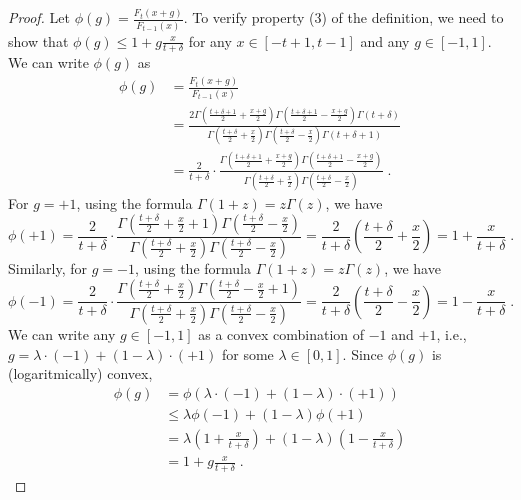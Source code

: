 \begin{proof}
Let $\phi(g) = \frac{F_t(x+g)}{F_{t-1}(x)}$. To verify property (3) of the definition,
we need to show that $\phi(g) \le 1 + g \frac{x}{t+\delta}$
for any $x \in [-t+1, t-1]$ and any $g \in [-1,1]$. We can write $\phi(g)$ as
\begin{align*}
\phi(g)
& = \frac{F_t(x+g)}{F_{t-1}(x)} \\
& = \frac{2 \Gamma(\frac{t+\delta+1}{2} + \frac{x+g}{2}) \Gamma(\frac{t+\delta+1}{2} - \frac{x+g}{2}) \Gamma(t + \delta)}{\Gamma(\frac{t+\delta}{2} + \frac{x}{2}) \Gamma(\frac{t+\delta}{2} - \frac{x}{2}) \Gamma(t+\delta+1)} \\
& = \frac{2}{t+\delta} \cdot \frac{\Gamma(\frac{t+\delta+1}{2} + \frac{x+g}{2}) \Gamma(\frac{t+\delta+1}{2} - \frac{x+g}{2})}{\Gamma(\frac{t+\delta}{2} + \frac{x}{2}) \Gamma(\frac{t+\delta}{2} - \frac{x}{2})} \; .
\end{align*}
For $g=+1$, using the formula $\Gamma(1+z) = z \Gamma(z)$, we have
$$
\phi(+1)
= \frac{2}{t+\delta} \cdot \frac{\Gamma(\frac{t+\delta}{2} + \frac{x}{2} + 1) \Gamma(\frac{t+\delta}{2} - \frac{x}{2})}{\Gamma(\frac{t+\delta}{2} + \frac{x}{2}) \Gamma(\frac{t+\delta}{2} - \frac{x}{2})}
= \frac{2}{t+\delta} \left(\frac{t+\delta}{2} + \frac{x}{2} \right)
= 1 + \frac{x}{t+\delta} \; .
$$
Similarly, for $g=-1$, using the formula $\Gamma(1+z) = z \Gamma(z)$, we have
$$
\phi(-1)
= \frac{2}{t+\delta} \cdot \frac{\Gamma(\frac{t+\delta}{2} + \frac{x}{2}) \Gamma(\frac{t+\delta}{2} - \frac{x}{2} + 1)}{\Gamma(\frac{t+\delta}{2} + \frac{x}{2}) \Gamma(\frac{t+\delta}{2} - \frac{x}{2})}
= \frac{2}{t+\delta} \left(\frac{t+\delta}{2} - \frac{x}{2} \right)
= 1 - \frac{x}{t+\delta} \; .
$$
We can write any $g \in [-1,1]$ as a convex combination of $-1$ and $+1$, i.e.,
$g = \lambda \cdot (-1) + (1-\lambda) \cdot (+1)$ for some $\lambda \in [0,1]$.
Since $\phi(g)$ is (logaritmically) convex,
\begin{align*}
\phi(g)
& = \phi(\lambda \cdot (-1) + (1-\lambda) \cdot (+1)) \\
& \le \lambda \phi(-1) + (1-\lambda) \phi(+1) \\
& = \lambda \left(1 + \frac{x}{t+\delta}\right) + (1-\lambda) \left(1 - \frac{x}{t+\delta}\right) \\
& = 1 + g \frac{x}{t+\delta} \; .
\end{align*}
\end{proof}
